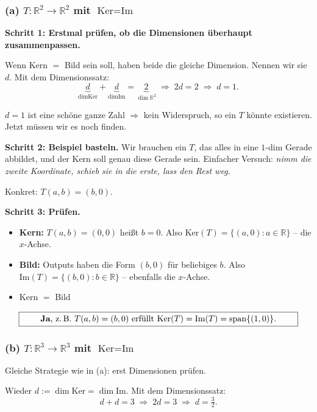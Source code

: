 \documentclass[a4paper,12pt]{article}
\begin{document}
\subsubsection*{(a) $T \colon \mathbb{R}^2 \to \mathbb{R}^2$ mit $\text{Ker} = \text{Im}$}

\textbf{Schritt 1: Erstmal pr\"ufen, ob die Dimensionen \"uberhaupt zusammenpassen.}

Wenn Kern $=$ Bild sein soll, haben beide die gleiche Dimension. Nennen wir sie $d$. Mit dem Dimensionssatz:
\[
\underbrace{d}_{\dim \text{Ker}} + \underbrace{d}_{\dim \text{Im}} = \underbrace{2}_{\dim \mathbb{R}^2}
\;\Rightarrow\; 2d = 2 \;\Rightarrow\; d = 1.
\]

$d = 1$ ist eine sch\"one ganze Zahl $\Rightarrow$ kein Widerspruch, so ein $T$ k\"onnte existieren. Jetzt m\"ussen wir es noch finden.

\textbf{Schritt 2: Beispiel basteln.} Wir brauchen ein $T$, das alles in eine $1$-dim Gerade abbildet, und der Kern soll genau diese Gerade sein. Einfacher Versuch: \emph{nimm die zweite Koordinate, schieb sie in die erste, lass den Rest weg.}

Konkret: $T(a, b) = (b, 0)$.

\textbf{Schritt 3: Pr\"ufen.}
\begin{itemize}[leftmargin=*, nosep]
    \item \textbf{Kern:} $T(a, b) = (0, 0)$ hei\ss t $b = 0$. Also $\text{Ker}(T) = \{(a, 0) : a \in \mathbb{R}\}$ -- die $x$-Achse.
    \item \textbf{Bild:} Outputs haben die Form $(b, 0)$ f\"ur beliebiges $b$. Also $\text{Im}(T) = \{(b, 0) : b \in \mathbb{R}\}$ -- ebenfalls die $x$-Achse.
    \item Kern $=$ Bild \checkmark
\end{itemize}

\[
\fbox{\parbox{0.93\textwidth}{\centering
\textbf{Ja}, z.\,B.\ $T(a, b) = (b, 0)$ erf\"ullt $\text{Ker}(T) = \text{Im}(T) = \text{span}\{(1, 0)\}$.
}}
\]

\subsubsection*{(b) $T \colon \mathbb{R}^3 \to \mathbb{R}^3$ mit $\text{Ker} = \text{Im}$}

Gleiche Strategie wie in (a): erst Dimensionen pr\"ufen.

Wieder $d := \dim \text{Ker} = \dim \text{Im}$. Mit dem Dimensionssatz:
\[
d + d = 3 \;\Rightarrow\; 2d = 3 \;\Rightarrow\; d = \tfrac{3}{2}.
\]
\end{document}
